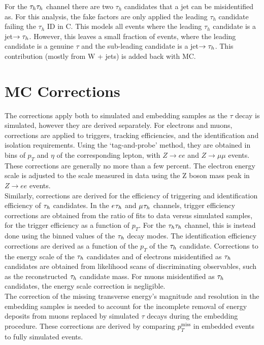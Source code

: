 For the $\tau_{h}\tau_{h}$ channel there are two $\tau_h$ candidates that a jet can be misidentified as.
For this analysis, the fake factors are only applied the leading $\tau_h$ candidate failing the $\tau_h$ ID in C.
This models all events where the leading $\tau_h$ candidate is a jet$\rightarrow\tau_{h}$.
However, this leaves a small fraction of events, where the leading candidate is a genuine $\tau$ and the sub-leading candidate is a jet$\rightarrow\tau_{h}$.
This contribution (mostly from W + jets) is added back with MC.

\section{MC Corrections}

The corrections apply both to simulated and embedding samples as the $\tau$ decay is simulated, however they are derived separately. 
For electrons and muons, corrections are applied to triggers, tracking efficiencies, and the identification and isolation requirements.
Using the `tag-and-probe' method, they are obtained in bins of $p_T$ and $\eta$ of the corresponding lepton, with $Z\rightarrow ee$ and $Z\rightarrow\mu\mu$ events. 
These corrections are generally no more than a few percent. 
The electron energy scale is adjusted to the scale measured in data using the Z boson mass peak in $Z\rightarrow ee$ events. \\

Similarly, corrections are derived for the efficiency of triggering and identification efficiency of $\tau_{h}$ candidates. 
In the $e_{}\tau_{h}$ and $\mu_{}\tau_{h}$ channels, trigger efficiency corrections are obtained from the ratio of fits to data versus simulated samples, for the trigger efficiency as a function of $p_{T}$. 
For the $\tau_{h}\tau_{h}$ channel, this is instead done using the binned values of the $\tau_{h}$ decay modes.
The identification efficiency corrections are derived as a function of the $p_T$ of the $\tau_{h}$ candidate. 
Corrections to the energy scale of the $\tau_{h}$ candidates and of electrons misidentified as $\tau_{h}$ candidates are obtained from likelihood scans of discriminating observables, such as the reconstructed $\tau_{h}$ candidate mass. 
For muons misidentified as $\tau_{h}$ candidates, the energy scale correction is negligible. \\

The correction of the missing transverse energy's magnitude and resolution in the embedding samples is needed to account for the incomplete removal of energy deposits from muons replaced by simulated $\tau$ decays during the embedding procedure. 
These corrections are derived by comparing $p_{T}^{\text{miss}}$ in embedded events to fully simulated events. \\

